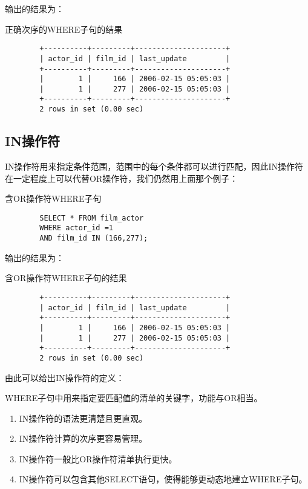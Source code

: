 \documentclass[UTF8]{article}
\begin{document}
输出的结果为：

\begin{listing}[H]
	\caption{正确次序的WHERE子句的结果}
	\label{code:rightwhereclauseresult}
\begin{verbatim}
        +----------+---------+---------------------+
        | actor_id | film_id | last_update         |
        +----------+---------+---------------------+
        |        1 |     166 | 2006-02-15 05:05:03 |
        |        1 |     277 | 2006-02-15 05:05:03 |
        +----------+---------+---------------------+
        2 rows in set (0.00 sec)
\end{verbatim}
\end{listing}

\subsection{IN操作符}
IN操作符用来指定条件范围，范围中的每个条件都可以进行匹配，因此IN操作符在一定程度上可以代替OR操作符，我们仍然用上面那个例子：
\begin{listing}[H]
	\caption{含OR操作符WHERE子句}
	\label{code:secondorwhereclause}
\begin{verbatim}
        SELECT * FROM film_actor 
        WHERE actor_id =1 
        AND film_id IN (166,277);
\end{verbatim}
\end{listing}

输出的结果为：

\begin{listing}[H]
	\caption{含OR操作符WHERE子句的结果}
	\label{code:secondorwhereclauseresult}
\begin{verbatim}
        +----------+---------+---------------------+
        | actor_id | film_id | last_update         |
        +----------+---------+---------------------+
        |        1 |     166 | 2006-02-15 05:05:03 |
        |        1 |     277 | 2006-02-15 05:05:03 |
        +----------+---------+---------------------+
        2 rows in set (0.00 sec)
\end{verbatim}
\end{listing}
由此可以给出IN操作符的定义：
\begin{redbox}[frametitle={Defination 7.5 IN操作符}]
        WHERE子句中用来指定要匹配值的清单的关键字，功能与OR相当。
\end{redbox}

\begin{orangebox}[frametitle={Tips 7.5}]
        \begin{enumerate}
            \item IN操作符的语法更清楚且更直观。
            \item IN操作符计算的次序更容易管理。
            \item IN操作符一般比OR操作符清单执行更快。
            \item IN操作符可以包含其他SELECT语句，使得能够更动态地建立WHERE子句。
        \end{enumerate}
\end{orangebox}
\end{document}
